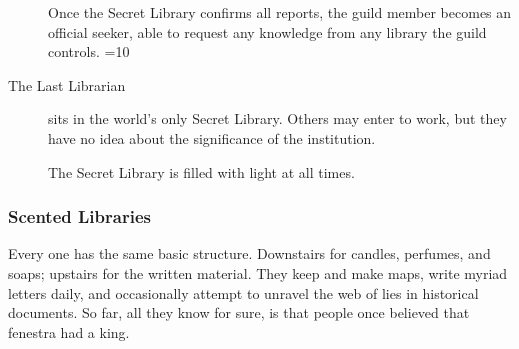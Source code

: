 \begin{multicols}{2}
\begin{description}
  Once the Secret Library confirms all reports, the guild member becomes an official seeker, able to request any knowledge from any library the guild controls.
  \ifnum\value{season}=10
  \item[The Last Librarian]
  sits in the world's only Secret Library.
  Others may enter to work, but they have no idea about the significance of the institution.

  The Secret Library is filled with light at all times.
  \fi
\end{description}

\subsubsection{Scented Libraries}

Every one has the same basic structure.
Downstairs for candles, perfumes, and soaps; upstairs for the written material.
They keep and make maps, write myriad letters daily, and occasionally attempt to unravel the web of lies in historical documents.
So far, all they know for sure, is that people once believed that \gls{fenestra} had a king.

\end{multicols}
